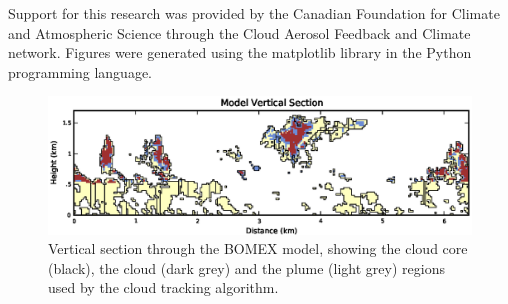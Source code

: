 \documentclass[acp]{copernicus}
\begin{document}

\begin{acknowledgements}
Support for this research was provided by the Canadian Foundation for Climate 
and Atmospheric Science through the Cloud Aerosol Feedback and Climate 
network.  Figures were generated using the matplotlib library in the Python
programming language.
\end{acknowledgements}


















\begin{figure}[t]
\vspace*{2mm}
\begin{center}
\includegraphics[width=\textwidth]{./figures/vertical_section}
\end{center}
\caption{Vertical section through the BOMEX model, showing the cloud core
(black), the cloud (dark grey) and the plume (light grey) regions used by the 
cloud tracking algorithm.}
\label{fig:cloudfinder_instructions}
\end{figure}
\end{document}
